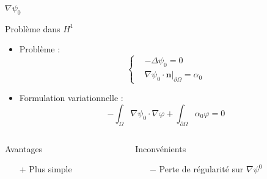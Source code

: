 \documentclass{beamer}
\newcommand{\grad}{{\nabla}}
\newcommand{\laplace}{{\Delta}}
\newcommand{\restr}{{\big\rvert_{\partial\Omega}}}
\begin{document}
\begin{frame}{$\grad\psi_0$}
\begin{block}{Problème dans $ H^1$}
\begin{itemize}
\item Problème :
\[\left\{\begin{aligned}
&-\laplace\psi_0 = 0\\
&\grad\psi_0\cdot \mathbf{n}\restr=\alpha_0
\end{aligned}\right.\]
\item Formulation variationnelle :
\[ -\int_\Omega \grad\psi_0\cdot\grad\varphi + \int_{\partial\Omega} \alpha_0\varphi = 0 \]
\end{itemize}
\end{block}
\begin{columns}[t]
\begin{column}{5cm}
\begin{exampleblock}{Avantages}
\begin{itemize}
\item[+] Plus simple
\end{itemize}
\end{exampleblock}
\end{column}
\begin{column}{5cm}
\begin{alertblock}{Inconvénients}
\begin{itemize}
\item[$-$] Perte de régularité sur $\grad\psi^0$
\end{itemize}
\end{alertblock}
\end{column}
\end{columns}
\end{frame}
\end{document}
